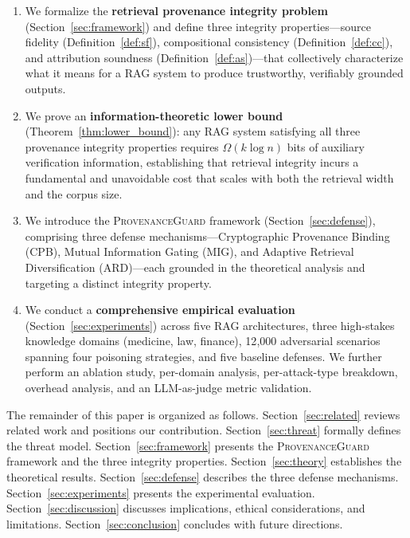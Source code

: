 \documentclass[journal,10pt]{IEEEtran}
\begin{document}
\begin{enumerate}[leftmargin=*]
\item We formalize the \textbf{retrieval provenance integrity problem} (Section~\ref{sec:framework}) and define three integrity properties---source fidelity (Definition~\ref{def:sf}), compositional consistency (Definition~\ref{def:cc}), and attribution soundness (Definition~\ref{def:as})---that collectively characterize what it means for a RAG system to produce trustworthy, verifiably grounded outputs.

\item We prove an \textbf{information-theoretic lower bound} (Theorem~\ref{thm:lower_bound}): any RAG system satisfying all three provenance integrity properties requires $\Omega(k \log n)$ bits of auxiliary verification information, establishing that retrieval integrity incurs a fundamental and unavoidable cost that scales with both the retrieval width and the corpus size.

\item We introduce the \textsc{ProvenanceGuard} framework (Section~\ref{sec:defense}), comprising three defense mechanisms---Cryptographic Provenance Binding (CPB), Mutual Information Gating (MIG), and Adaptive Retrieval Diversification (ARD)---each grounded in the theoretical analysis and targeting a distinct integrity property.

\item We conduct a \textbf{comprehensive empirical evaluation} (Section~\ref{sec:experiments}) across five RAG architectures, three high-stakes knowledge domains (medicine, law, finance), 12{,}000 adversarial scenarios spanning four poisoning strategies, and five baseline defenses. We further perform an ablation study, per-domain analysis, per-attack-type breakdown, overhead analysis, and an LLM-as-judge metric validation.
\end{enumerate}

The remainder of this paper is organized as follows. Section~\ref{sec:related} reviews related work and positions our contribution. Section~\ref{sec:threat} formally defines the threat model. Section~\ref{sec:framework} presents the \textsc{ProvenanceGuard} framework and the three integrity properties. Section~\ref{sec:theory} establishes the theoretical results. Section~\ref{sec:defense} describes the three defense mechanisms. Section~\ref{sec:experiments} presents the experimental evaluation. Section~\ref{sec:discussion} discusses implications, ethical considerations, and limitations. Section~\ref{sec:conclusion} concludes with future directions.
\end{document}
